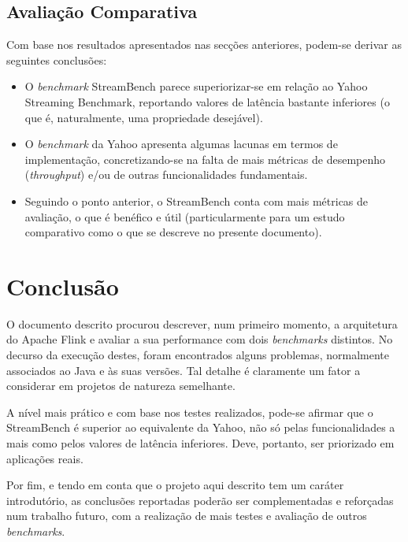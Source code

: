 \documentclass[conference]{IEEEtran}
\begin{document}
\subsection{Avaliação Comparativa}
\label{yahoo}

Com base nos resultados apresentados nas secções anteriores, podem-se derivar as seguintes conclusões:

\begin{itemize}
    \item O \emph{benchmark} StreamBench parece superiorizar-se em relação ao Yahoo Streaming Benchmark, reportando valores de latência bastante inferiores (o que é, naturalmente, uma propriedade desejável).
    \item O \emph{benchmark} da Yahoo apresenta algumas lacunas em termos de implementação, concretizando-se na falta de mais métricas de desempenho (\emph{throughput}) e/ou de outras funcionalidades fundamentais.
    \item Seguindo o ponto anterior, o StreamBench conta com mais métricas de avaliação, o que é benéfico e útil (particularmente para um estudo comparativo como o que se descreve no presente documento).
\end{itemize}

\section{Conclusão}
\label{conclusao}

O documento descrito procurou descrever, num primeiro momento, a arquitetura do Apache Flink e avaliar a sua performance com dois \emph{benchmarks} distintos. No decurso da execução destes, foram encontrados alguns problemas, normalmente associados ao Java e às suas versões. Tal detalhe é claramente um fator a considerar em projetos de natureza semelhante.

A nível mais prático e com base nos testes realizados, pode-se afirmar que o StreamBench é superior ao equivalente da Yahoo, não só pelas funcionalidades a mais como pelos valores de latência inferiores. Deve, portanto, ser priorizado em aplicações reais.

Por fim, e tendo em conta que o projeto aqui descrito tem um caráter introdutório, as conclusões reportadas poderão ser complementadas e reforçadas num trabalho futuro, com a realização de mais testes e avaliação de outros \emph{benchmarks}.

\end{document}
